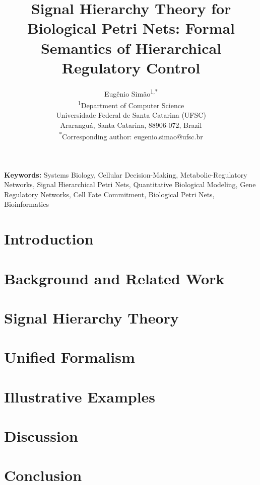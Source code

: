 \documentclass[twocolumn,11pt]{article}
\title{\textbf{Signal Hierarchy Theory for Biological Petri Nets: Formal Semantics of Hierarchical Regulatory Control}}
\author{
Eugênio Simão\textsuperscript{1,*}\\
\textsuperscript{1}Department of Computer Science\\
Universidade Federal de Santa Catarina (UFSC)\\
Araranguá, Santa Catarina, 88906-072, Brazil\\
\textsuperscript{*}Corresponding author: eugenio.simao@ufsc.br
}
\date{}
\begin{document}
\maketitle

\begin{abstract}

\end{abstract}

\vspace{6pt}
\noindent\textbf{Keywords:} Systems Biology, Cellular Decision-Making, Metabolic-Regulatory Networks, Signal Hierarchical Petri Nets, Quantitative Biological Modeling, Gene Regulatory Networks, Cell Fate Commitment, Biological Petri Nets, Bioinformatics

\section{Introduction}


\section{Background and Related Work}


\section{Signal Hierarchy Theory}


\section{Unified Formalism}


\section{Illustrative Examples}


\section{Discussion}


\section{Conclusion}




\balance  %



\end{document}
